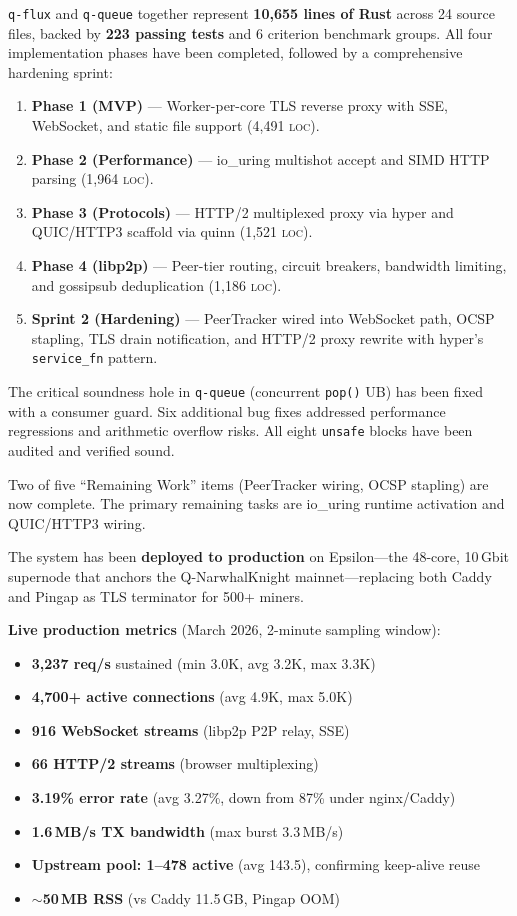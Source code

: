 \documentclass[a4paper, 11pt]{article}
\newcommand{\qflux}{\texttt{q-flux}}
\newcommand{\qqueue}{\texttt{q-queue}}
\newcommand{\loc}{\textsc{loc}}
\begin{document}
\qflux{} and \qqueue{} together represent \textbf{10,655 lines of Rust}
across 24 source files, backed by \textbf{223 passing tests} and 6 criterion
benchmark groups.  All four implementation phases have been completed,
followed by a comprehensive hardening sprint:

\begin{enumerate}[nosep]
  \item \textbf{Phase 1 (MVP)} --- Worker-per-core TLS reverse proxy
        with SSE, WebSocket, and static file support (4,491 \loc{}).
  \item \textbf{Phase 2 (Performance)} --- io\_uring multishot accept
        and SIMD HTTP parsing (1,964 \loc{}).
  \item \textbf{Phase 3 (Protocols)} --- HTTP/2 multiplexed proxy via
        hyper and QUIC/HTTP3 scaffold via quinn (1,521 \loc{}).
  \item \textbf{Phase 4 (libp2p)} --- Peer-tier routing, circuit
        breakers, bandwidth limiting, and gossipsub deduplication
        (1,186 \loc{}).
  \item \textbf{Sprint 2 (Hardening)} --- PeerTracker wired into WebSocket
        path, OCSP stapling, TLS drain notification, and HTTP/2 proxy
        rewrite with hyper's \texttt{service\_fn} pattern.
\end{enumerate}

The critical soundness hole in \qqueue{} (concurrent \texttt{pop()} UB)
has been fixed with a consumer guard.  Six additional bug fixes
addressed performance regressions and arithmetic overflow risks.
All eight \texttt{unsafe} blocks have been audited and verified sound.

Two of five ``Remaining Work'' items (PeerTracker wiring, OCSP stapling)
are now complete.  The primary remaining tasks are io\_uring runtime
activation and QUIC/HTTP3 wiring.

The system has been \textbf{deployed to production} on Epsilon---the 48-core,
10\,Gbit supernode that anchors the Q-NarwhalKnight mainnet---replacing
both Caddy and Pingap as TLS terminator for 500+ miners.

\textbf{Live production metrics} (March 2026, 2-minute sampling window):

\begin{itemize}[nosep]
  \item \textbf{3,237 req/s} sustained (min 3.0K, avg 3.2K, max 3.3K)
  \item \textbf{4,700+ active connections} (avg 4.9K, max 5.0K)
  \item \textbf{916 WebSocket streams} (libp2p P2P relay, SSE)
  \item \textbf{66 HTTP/2 streams} (browser multiplexing)
  \item \textbf{3.19\% error rate} (avg 3.27\%, down from 87\% under nginx/Caddy)
  \item \textbf{1.6\,MB/s TX bandwidth} (max burst 3.3\,MB/s)
  \item \textbf{Upstream pool: 1--478 active} (avg 143.5), confirming keep-alive reuse
  \item \textbf{$\sim$50\,MB RSS} (vs Caddy 11.5\,GB, Pingap OOM)
\end{itemize}
\end{document}
